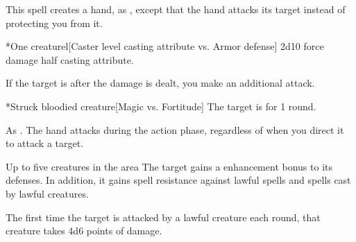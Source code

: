 \begin{spellheader}
    \spellrng{\rngmed}
    \spelldur{\durshort \dismissable}
\end{spellheader}
\begin{spelleffects}
    \spelleffect This spell creates a hand, as , except that the hand attacks its target instead of protecting you from it.
    \begin{spelltarget}*{One creature}l[Caster level \add casting attribute vs. Armor defense]
        \spellsuccess 2d10 force damage \add half casting attribute.

        If the target is \bloodied after the damage is dealt, you make an additional attack.
        \begin{spelltarget}*{Struck bloodied creature}[Magic vs. Fortitude]
            \spellsuccess The target is \dazed for 1 round.
        \end{spelltarget}
    \end{spelltarget}
\end{spelleffects}
\begin{spellfooter}
    \spellnotes As . The hand attacks during the action phase, regardless of when you direct it to attack a target.
\end{spellfooter}

\begin{spellheader}
    \spelldur{\durshort \dismissable}
\end{spellheader}
\begin{spelleffects}
    \begin{spelltargets}{Up to five creatures in the area}
        The target gains a  enhancement bonus to its defenses. In addition, it gains spell resistance against lawful spells and spells cast by lawful creatures.
        \par The first time the target is attacked by a lawful creature each round, that creature takes 4d6 points of damage.
    \end{spelltargets}
\end{spelleffects}

